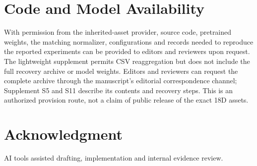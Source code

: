 \documentclass[conference]{IEEEtran}
\begin{document}
\section{Code and Model Availability}

With permission from the inherited-asset provider, source code, pretrained weights, the matching normalizer, configurations and records needed to reproduce the reported experiments can be provided to editors and reviewers upon request. The lightweight supplement permits CSV reaggregation but does not include the full recovery archive or model weights. Editors and reviewers can request the complete archive through the manuscript's editorial correspondence channel; Supplement S5 and S11 describe its contents and recovery steps. This is an authorized provision route, not a claim of public release of the exact 18D assets.

\section*{Acknowledgment}

AI tools assisted drafting, implementation and internal evidence review.
\end{document}
